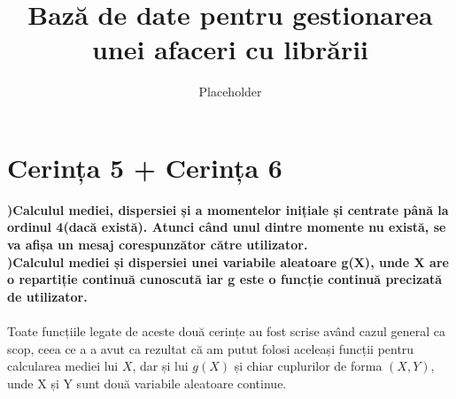 \documentclass[12pt]{article}
\title{Bază de date pentru gestionarea unei afaceri cu librării}
\author{Placeholder}
\begin{document}
\section{Cerința 5 + Cerința 6}
\textbf{\indent {})Calculul mediei, dispersiei și a momentelor inițiale și centrate până la ordinul 4(dacă există). Atunci când unul dintre momente nu există, se va afișa un mesaj corespunzător către utilizator.\\
\indent {})Calculul  mediei și  dispersiei unei  variabile  aleatoare g(X), unde  X are  o repartiție continuă cunoscută iar g este o funcție continuă precizată de utilizator.} \\\\
\indent Toate funcțiile legate de aceste două cerințe au fost scrise având cazul general ca scop, ceea ce a a avut ca rezultat că am putut folosi aceleași funcții pentru calcularea mediei lui $X$, dar și lui $g(X)$ și chiar cuplurilor de forma $(X,Y)$, unde X și Y sunt două variabile aleatoare continue.\\
\end{document}
